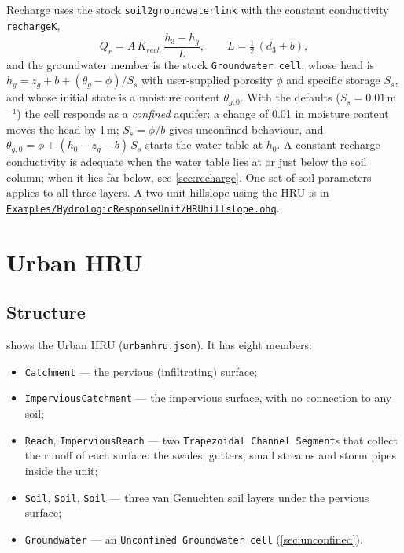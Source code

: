 \documentclass[11pt,a4paper]{article}
\newcommand{\code}[1]{\texttt{\small #1}}
\newcommand{\file}[1]{\texttt{\small #1}}
\renewcommand{\_}{\oldus\allowbreak}   %
\newcommand{\ghbase}{https://github.com/ArashMassoudieh/OpenHydroQual/blob/master}
\newcommand{\exfile}[1]{\href{\ghbase/#1}{\file{#1}}}
\begin{document}
\noindent Recharge uses the stock \code{soil2groundwater\_link} with the constant conductivity
\code{recharge\_K},
\begin{equation}
  Q_r=A\,K_{rech}\,\frac{h_3-h_g}{L},\qquad L=\tfrac12\,(d_3+b),
\end{equation}
and the groundwater member is the stock \code{Groundwater cell}, whose head is
$h_g=z_g+b+(\theta_g-\phi)/S_s$ with user-supplied porosity $\phi$ and specific storage $S_s$, and whose
initial state is a moisture content $\theta_{g,0}$. With the defaults ($S_s=0.01$\,m$^{-1}$) the cell
responds as a \emph{confined} aquifer: a change of 0.01 in moisture content moves the head by 1\,m;
$S_s=\phi/b$ gives unconfined behaviour, and $\theta_{g,0}=\phi+(h_0-z_g-b)\,S_s$ starts the water table
at $h_0$. A constant recharge conductivity is
adequate when the water table lies at or just below the soil column; when it lies far below, see
\cref{sec:recharge}. One set of soil parameters applies to all three layers. A two-unit hillslope
using the HRU is in \exfile{Examples/Hydrologic\_Response\_Unit/HRU\_hillslope.ohq}.

\section{Urban HRU}
\label{sec:urbanspec}

\subsection{Structure}
 shows the Urban HRU (\file{urban\_hru.json}). It has eight members:

\begin{itemize}[leftmargin=1.4em]
\item \code{Catchment} --- the pervious (infiltrating) surface;
\item \code{Impervious\_Catchment} --- the impervious surface, with no connection to any soil;
\item \code{Reach}, \code{Impervious\_Reach} --- two \code{Trapezoidal Channel Segment}s that collect
      the runoff of each surface: the swales, gutters, small streams and storm pipes inside the unit;
\item \code{Soil\_1}, \code{Soil\_2}, \code{Soil\_3} --- three van Genuchten soil layers under the
      pervious surface;
\item \code{Groundwater} --- an \code{Unconfined Groundwater cell} (\cref{sec:unconfined}).
\end{itemize}
\end{document}
